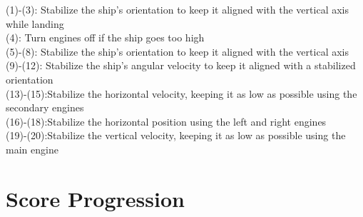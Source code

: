 \documentclass[a4paper, 12pt, fleqn]{report}
\begin{document}
(1)-(3): Stabilize the ship's orientation to keep it aligned with the vertical axis while landing \\
(4): Turn engines off if the ship goes too high \\
(5)-(8): Stabilize the ship's orientation to keep it aligned with the vertical axis \\
(9)-(12): Stabilize the ship's angular velocity to keep it aligned with a stabilized orientation \\
(13)-(15):Stabilize the horizontal velocity, keeping it as low as possible using the secondary engines \\
(16)-(18):Stabilize the horizontal position using the left and right engines \\
(19)-(20):Stabilize the vertical velocity, keeping it as low as possible using the main engine \\

\newpage
\section*{\fontsize{16}{20}\selectfont Score Progression}
\end{document}
